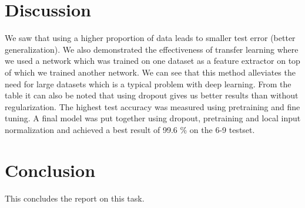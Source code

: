 \documentclass[11pt]{article}
\begin{document}
\section{Discussion}
We saw that using a higher proportion of data leads to smaller test error (better generalization). 
We also demonstrated the effectiveness of transfer learning where we used a network which was trained on 
one dataset as a feature extractor on top of which we trained another network. We can see that this 
method alleviates the need for large datasets which is a typical problem with deep learning. 
From the table it can also be noted that using dropout gives us better results than without regularization.
The highest test accuracy was measured using pretraining and fine tuning. A final model was put together using dropout, pretraining and local input normalization and achieved a best result of 99.6 \% on the 6-9 testset. 


\section{Conclusion}
This concludes the report on this task.
\end{document}
